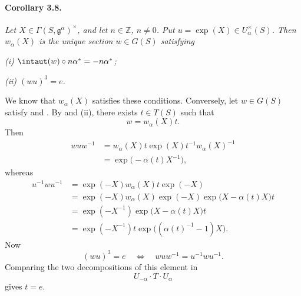 \paragraph{\textbf{Corollary 3.8.}}
\emph{Let \(X\in\Gamma(S,\mathfrak g^\alpha)^\times\), and let
\(n\in\mathbb Z\), \(n\ne0\).  Put \(u=\exp(X)\in U_\alpha^\times(S)\).
Then \(w_\alpha(X)\) is the unique
section \(w\in G(S)\) satisfying}

\smallskip
\noindent\emph{\textup{(i)}
\(\intaut(w)\circ n\alpha^\ast=-n\alpha^\ast\);}

\smallskip
\noindent\emph{\textup{(ii)}
\((wu)^3=e\).}

\smallskip
We know that \(w_\alpha(X)\) satisfies these conditions.  Conversely,
let \(w\in G(S)\) satisfy \textup{} and \textup{}.  By  and
 \textup{(ii)}, there exists \(t\in T(S)\) such that
\[
  w=w_\alpha(X)t.
\]
Then
\[
\begin{aligned}
  wuw^{-1}
    &=w_\alpha(X)t\exp(X)t^{-1}w_\alpha(X)^{-1}\\
    &=\exp\bigl(-\alpha(t)X^{-1}\bigr),
\end{aligned}
\]
whereas
\[
\begin{aligned}
  u^{-1}wu^{-1}
    &={}\exp(-X)w_\alpha(X)t\exp(-X)\\
    &={}\exp(-X)w_\alpha(X)\exp(-X)
       \exp\bigl(X-\alpha(t)X\bigr)t\\
    &={}\exp(-X^{-1})\exp\bigl(X-\alpha(t)X\bigr)t\\
    &={}\exp(-X^{-1})t
       \exp\bigl((\alpha(t)^{-1}-1)X\bigr).
\end{aligned}
\]
Now
\[
  (wu)^3=e
  \quad\Longleftrightarrow\quad
  wuw^{-1}=u^{-1}wu^{-1}.
\]
Comparing the two decompositions of this element in
\[
  U_{-\alpha}\cdot T\cdot U_\alpha
\]
gives \(t=e\).
